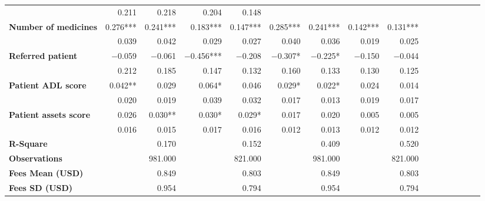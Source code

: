 \begin{tabular}{@{\extracolsep{5pt}}lrrrrrrrrrrrrrrr}
{\bf } & 0.211\phantom{***} & 0.218\phantom{***} & 0.204\phantom{***} & 0.148\phantom{***} & \phantom{***} & \phantom{***} & \phantom{***} & \phantom{***} \\
{\bf Number of medicines} & 0.276*** & 0.241*** & 0.183*** & 0.147*** & 0.285*** & 0.241*** & 0.142*** & 0.131*** \\
{\bf } & 0.039\phantom{***} & 0.042\phantom{***} & 0.029\phantom{***} & 0.027\phantom{***} & 0.040\phantom{***} & 0.036\phantom{***} & 0.019\phantom{***} & 0.025\phantom{***} \\
{\bf Referred patient} & $-$0.059\phantom{***} & $-$0.061\phantom{***} & $-$0.456*** & $-$0.208\phantom{***} & $-$0.307*\phantom{**} & $-$0.225*\phantom{**} & $-$0.150\phantom{***} & $-$0.044\phantom{***} \\
{\bf } & 0.212\phantom{***} & 0.185\phantom{***} & 0.147\phantom{***} & 0.132\phantom{***} & 0.160\phantom{***} & 0.133\phantom{***} & 0.130\phantom{***} & 0.125\phantom{***} \\
{\bf Patient ADL score} & 0.042**\phantom{*} & 0.029\phantom{***} & 0.064*\phantom{**} & 0.046\phantom{***} & 0.029*\phantom{**} & 0.022*\phantom{**} & 0.024\phantom{***} & 0.014\phantom{***} \\
{\bf } & 0.020\phantom{***} & 0.019\phantom{***} & 0.039\phantom{***} & 0.032\phantom{***} & 0.017\phantom{***} & 0.013\phantom{***} & 0.019\phantom{***} & 0.017\phantom{***} \\
{\bf Patient assets score} & 0.026\phantom{***} & 0.030**\phantom{*} & 0.030*\phantom{**} & 0.029*\phantom{**} & 0.017\phantom{***} & 0.020\phantom{***} & 0.005\phantom{***} & 0.005\phantom{***} \\
{\bf } & 0.016\phantom{***} & 0.015\phantom{***} & 0.017\phantom{***} & 0.016\phantom{***} & 0.012\phantom{***} & 0.013\phantom{***} & 0.012\phantom{***} & 0.012\phantom{***} \\
{\bf R-Square} & \phantom{***} & 0.170\phantom{***} & \phantom{***} & 0.152\phantom{***} & \phantom{***} & 0.409\phantom{***} & \phantom{***} & 0.520\phantom{***} \\
{\bf Observations} & \phantom{***} & 981.000\phantom{***} & \phantom{***} & 821.000\phantom{***} & \phantom{***} & 981.000\phantom{***} & \phantom{***} & 821.000\phantom{***} \\
{\bf Fees Mean (USD)} & \phantom{***} & 0.849\phantom{***} & \phantom{***} & 0.803\phantom{***} & \phantom{***} & 0.849\phantom{***} & \phantom{***} & 0.803\phantom{***} \\
{\bf Fees SD (USD)} & \phantom{***} & 0.954\phantom{***} & \phantom{***} & 0.794\phantom{***} & \phantom{***} & 0.954\phantom{***} & \phantom{***} & 0.794\phantom{***} \\
\hline
\end{tabular}
